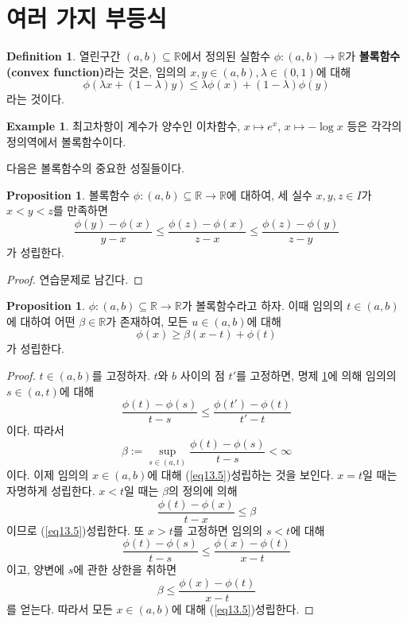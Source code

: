 \documentclass[11pt]{book}
\numberwithin{equation}{chapter}
\def\RR{\mathbb{R}}
\theoremstyle{definition}
\newtheorem{prop}[thm]{Proposition}
\newtheorem{defn}[thm]{Definition}
\newtheorem*{ex}{Example}
\begin{document}
\section{여러 가지 부등식}

\begin{defn}
    열린구간 \((a, b) \subseteq \RR\)에서 정의된 실함수 \(\phi : (a, b) \to \RR\)가 \textbf{볼록함수(convex function)}라는 것은, 임의의 \(x, y \in (a, b), \lambda \in (0, 1)\)에 대해
    \[
        \phi(\lambda x + (1-\lambda)y) \le \lambda \phi(x) + (1-\lambda)\phi(y)    
    \]
    라는 것이다.
\end{defn}

\begin{ex}
    최고차항이 계수가 양수인 이차함수, \(x \mapsto e^x\), \(x \mapsto - \log x\) 등은 각각의 정의역에서 볼록함수이다.
\end{ex}

다음은 볼록함수의 중요한 성질들이다.

\begin{prop} \label{13.2.2}
    볼록함수 \(\phi : (a, b) \subseteq \RR \to \RR\)에 대하여, 세 실수 \(x, y, z \in I\)가 \(x < y < z\)를 만족하면
    \[
    \frac{\phi(y) - \phi(x)}{y - x} \le   \frac{\phi(z) - \phi(x)}{z - x}  \le \frac{\phi(z) - \phi(y)}{z - y}
    \]
    가 성립한다.
\end{prop}
\begin{proof}
    연습문제로 남긴다.
\end{proof}

\begin{prop}
    \(\phi : (a, b) \subseteq \RR \to \RR\)가 볼록함수라고 하자. 이때 임의의 \(t \in (a, b)\)에 대하여 어떤 \(\beta \in \RR\)가 존재하여, 모든 \(u \in (a, b)\)에 대해
    \begin{equation} \label{eq13.5}
        \phi(x) \ge \beta(x-t) + \phi(t)
    \end{equation}
    가 성립한다.
\end{prop}
\begin{proof}
    \(t \in (a, b)\)를 고정하자. \(t\)와 \(b\) 사이의 점 \(t'\)를 고정하면, 명제 \ref{13.2.2}에 의해 임의의 \(s \in (a, t)\)에 대해
    \[
    \frac{\phi(t) - \phi(s)}{t - s}  \le \frac{\phi(t') - \phi(t)}{t' - t}   
    \]
    이다. 따라서
    \[
    \beta := \sup_{s \in (a, t)} \frac{\phi(t) - \phi(s)}{t - s} < \infty  
    \]
    이다. 이제 임의의 \(x \in (a, b)\)에 대해 (\ref{eq13.5})\가 성립하는 것을 보인다. \(x = t\)일 때는 자명하게 성립한다. \(x < t\)일 때는 \(\beta\)의 정의에 의해
    \[
    \frac{\phi(t) - \phi(x)}{t - x} \le \beta    
    \]
    이므로 (\ref{eq13.5})\가 성립한다. 또 \(x > t\)를 고정하면 임의의 \(s < t\)에 대해
    \[
        \frac{\phi(t) - \phi(s)}{t - s} \le \frac{\phi(x) - \phi(t)}{x - t}
    \]
    이고, 양변에 \(s\)에 관한 상한을 취하면
    \[
    \beta \le \frac{\phi(x) - \phi(t)}{x - t}    
    \]
    를 얻는다. 따라서 모든 \(x \in (a, b)\)에 대해 (\ref{eq13.5})\가 성립한다.
\end{proof}
\end{document}
